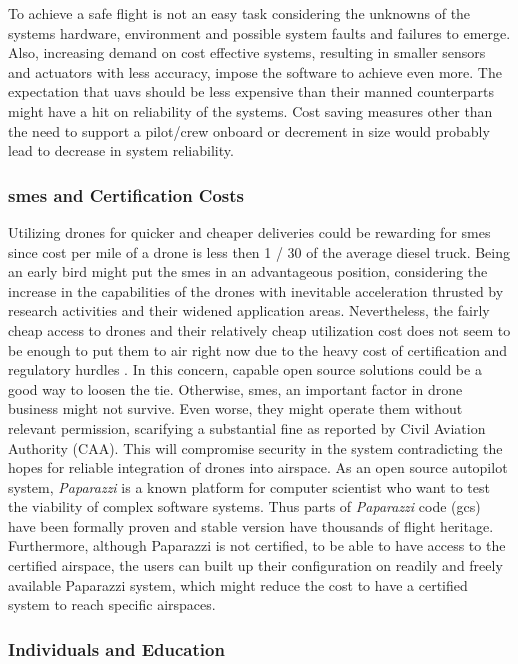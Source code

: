 To achieve a safe flight is not an easy task considering the unknowns of the systems hardware, environment and possible system faults and failures to emerge. Also, increasing demand on cost effective systems, resulting in smaller sensors and actuators with less accuracy, impose the software to achieve even more. The expectation that \gls{uav}s should be less expensive than their manned counterparts might have a hit on reliability of the systems. Cost saving measures other than the need to support a pilot/crew onboard or decrement in size would probably lead to decrease in system reliability. 

\subsubsection{\gls{sme}s and Certification Costs}

Utilizing drones for quicker and cheaper deliveries could be rewarding for \gls{sme}s since cost per mile of a drone is less then 1 / 30 of the average diesel truck. Being an early bird might put the \gls{sme}s in an advantageous position, considering the increase in the capabilities of the drones with inevitable acceleration thrusted by research activities and their widened application areas. 
Nevertheless, the fairly cheap access to drones and their relatively cheap utilization cost does not seem to be enough to put them to air right now due to the heavy cost of certification and regulatory hurdles \cite{UAVreliabilityStudy}. In this concern, capable open source solutions could be a good way to loosen the tie.  Otherwise, \gls{sme}s, an important factor in drone business might not survive. Even worse, they might operate them without relevant permission, scarifying a substantial fine as reported by Civil Aviation Authority (CAA). This will compromise security in the system contradicting the hopes for reliable integration of drones into airspace. As an open source autopilot system, \emph{Paparazzi} is a known platform for computer scientist who want to test the viability of complex software systems. Thus parts of \emph{Paparazzi} code (\gls{gcs}) have been formally proven \cite{pprz_formal_proof} and stable version have thousands of flight heritage. Furthermore, although Paparazzi is not certified, to be able to have access to the certified airspace, the users can built up their configuration on readily and freely available Paparazzi system, which might reduce the cost to have a certified system to reach specific airspaces.

\subsubsection{Individuals and Education}

